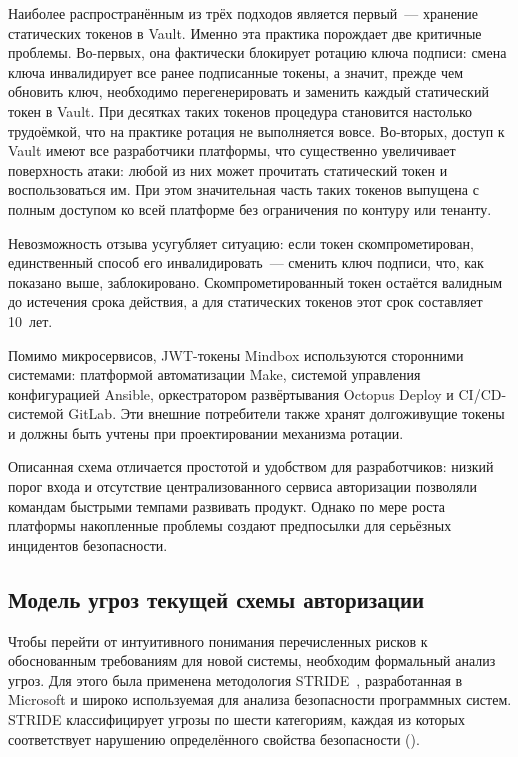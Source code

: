 Наиболее распространённым из трёх подходов является первый~---
хранение статических токенов в Vault.
Именно эта практика порождает две критичные проблемы.
Во-первых, она фактически блокирует ротацию ключа подписи:
смена ключа инвалидирует все ранее подписанные токены,
а значит, прежде чем обновить ключ,
необходимо перегенерировать и заменить каждый статический токен в Vault.
При десятках таких токенов процедура становится настолько трудоёмкой,
что на практике ротация не выполняется вовсе.
Во-вторых, доступ к Vault имеют все разработчики платформы,
что существенно увеличивает поверхность атаки:
любой из них может прочитать статический токен и воспользоваться им.
При этом значительная часть таких токенов выпущена с полным доступом
ко всей платформе без ограничения по контуру или тенанту.

Невозможность отзыва усугубляет ситуацию:
если токен скомпрометирован, единственный способ его инвалидировать~---
сменить ключ подписи, что, как показано выше, заблокировано.
Скомпрометированный токен остаётся валидным до истечения срока действия,
а для статических токенов этот срок составляет 10~лет.

Помимо микросервисов, JWT-токены Mindbox используются сторонними системами:
платформой автоматизации Make, системой управления конфигурацией Ansible,
оркестратором развёртывания Octopus Deploy и CI/CD-системой GitLab.
Эти внешние потребители также хранят долгоживущие токены
и должны быть учтены при проектировании механизма ротации.

Описанная схема отличается простотой и удобством для разработчиков:
низкий порог входа и отсутствие централизованного сервиса авторизации
позволяли командам быстрыми темпами развивать продукт.
Однако по мере роста платформы накопленные проблемы
создают предпосылки для серьёзных инцидентов безопасности.

\subsection{Модель угроз текущей схемы авторизации}\label{subsec:threat-model}

Чтобы перейти от интуитивного понимания перечисленных рисков
к обоснованным требованиям для новой системы,
необходим формальный анализ угроз.
Для этого была применена методология STRIDE~\cite{MicrosoftSTRIDE, OWASPThreatModeling},
разработанная в Microsoft и широко используемая для анализа безопасности программных систем.
STRIDE классифицирует угрозы по шести категориям,
каждая из которых соответствует нарушению определённого свойства безопасности ().

